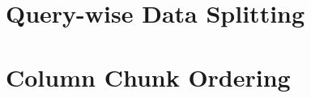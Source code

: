 \section{Query-wise Data Splitting}
\label{sec:split-size}

\section{Column Chunk Ordering}
\label{sec:chunk-ordering}
